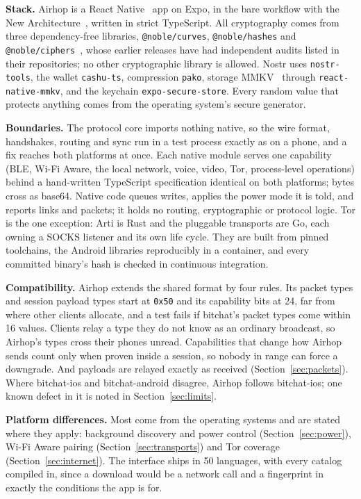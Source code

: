 \documentclass[conference]{IEEEtran}
\newcommand{\code}[1]{\texttt{#1}}
\newcommand{\hx}[1]{\texttt{0x#1}}
\begin{document}
\textbf{Stack.} Airhop is a React Native~\cite{reactnative} app on Expo, in the bare workflow with the New Architecture~\cite{rnnewarch}, written in strict TypeScript. All cryptography comes from three dependency-free libraries, \code{@noble/curves}, \code{@noble/hashes} and \code{@noble/ciphers}~\cite{noblecurves,noblehashes,nobleciphers}, whose earlier releases have had independent audits listed in their repositories; no other cryptographic library is allowed. Nostr uses \code{nostr-tools}, the wallet \code{cashu-ts}, compression \code{pako}, storage MMKV~\cite{mmkv} through \code{react-native-mmkv}, and the keychain \code{expo-secure-store}. Every random value that protects anything comes from the operating system's secure generator.

\textbf{Boundaries.} The protocol core imports nothing native, so the wire format, handshakes, routing and sync run in a test process exactly as on a phone, and a fix reaches both platforms at once. Each native module serves one capability (BLE, Wi-Fi Aware, the local network, voice, video, Tor, process-level operations) behind a hand-written TypeScript specification identical on both platforms; bytes cross as base64. Native code queues writes, applies the power mode it is told, and reports links and packets; it holds no routing, cryptographic or protocol logic. Tor is the one exception: Arti is Rust and the pluggable transports are Go, each owning a SOCKS listener and its own life cycle. They are built from pinned toolchains, the Android libraries reproducibly in a container, and every committed binary's hash is checked in continuous integration.

\textbf{Compatibility.} Airhop extends the shared format by four rules. Its packet types and session payload types start at \hx{50} and its capability bits at 24, far from where other clients allocate, and a test fails if bitchat's packet types come within 16 values. Clients relay a type they do not know as an ordinary broadcast, so Airhop's types cross their phones unread. Capabilities that change how Airhop sends count only when proven inside a session, so nobody in range can force a downgrade. And payloads are relayed exactly as received (Section~\ref{sec:packets}). Where bitchat-ios and bitchat-android disagree, Airhop follows bitchat-ios; one known defect in it is noted in Section~\ref{sec:limits}.

\textbf{Platform differences.} Most come from the operating systems and are stated where they apply: background discovery and power control (Section~\ref{sec:power}), Wi-Fi Aware pairing (Section~\ref{sec:transports}) and Tor coverage (Section~\ref{sec:internet}). The interface ships in 50 languages, with every catalog compiled in, since a download would be a network call and a fingerprint in exactly the conditions the app is for.
\end{document}
